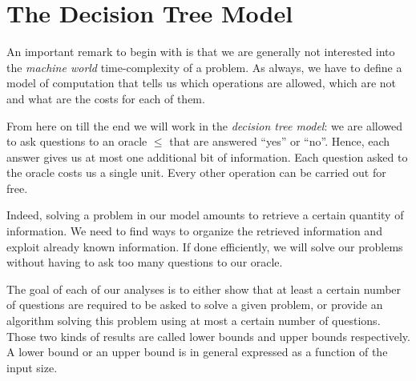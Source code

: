 \section{The Decision Tree Model}
\label{tree:sorting:model}

An important remark to begin with is that we are generally not interested
into the \emph{machine world} time-complexity of a problem. As always, we have to
define a model of computation that tells us which operations are allowed, which
are not and what are the costs for each of them.

From here on till the end we will work in the \emph{decision tree model}:
we are allowed to ask questions to an oracle \(\le\) that are answered
``yes'' or ``no''. Hence, each answer gives us at most
one additional bit of information.
Each question asked to the oracle costs us a single unit.
Every other operation can be carried out for free.

Indeed, solving a problem in
our model amounts to retrieve a certain quantity of information. We
need to find ways to organize the retrieved information and exploit already
known information. If done efficiently, we will solve our problems without
having to ask too many questions to our oracle.

The goal of each of our analyses is to either show that at least a certain
number of questions are required to be asked to solve a given problem, or
provide an algorithm solving this problem using at most a certain number of
questions. Those two kinds of results are called lower bounds and upper bounds
respectively. A lower bound or an upper bound is in general expressed as
a function of the input size.
